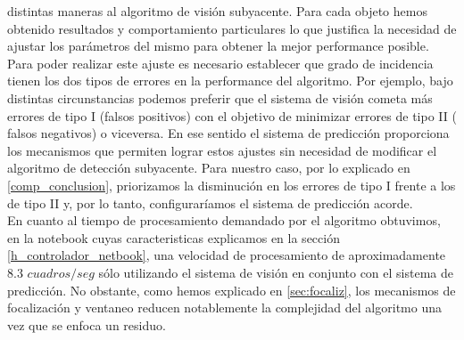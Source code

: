 distintas maneras al algoritmo de visi\'on subyacente. Para cada objeto 
hemos obtenido resultados y comportamiento particulares lo que 
justifica la necesidad de ajustar los par\'ametros del mismo para obtener la mejor 
performance posible. Para poder realizar este ajuste es necesario 
establecer que grado de incidencia tienen los dos tipos de errores en la performance del
algoritmo. Por ejemplo, bajo distintas circunstancias podemos preferir que el  
sistema de visi\'on cometa m\'as errores de tipo I (falsos positivos) con 
el objetivo de minimizar errores de tipo II ( falsos negativos) o 
viceversa. En ese sentido el sistema de predicci\'on proporciona los mecanismos que 
permiten lograr estos ajustes sin necesidad de modificar el algoritmo de detecci\'on 
subyacente. Para nuestro caso, por lo explicado en \ref{comp_conclusion}, priorizamos 
la disminuci\'on en los errores de tipo I frente a los de tipo II y, por lo tanto, configurar\'iamos
el sistema de predicci\'on acorde.\\
\indent En cuanto al tiempo de procesamiento demandado por el algoritmo obtuvimos, en la notebook
cuyas caracteristicas explicamos en la secci\'on \ref{h_controlador_netbook},
una velocidad de procesamiento de aproximadamente $8.3$ $cuadros/seg$ s\'olo utilizando
el sistema de visi\'on en conjunto con el sistema de predicci\'on. No obstante, como hemos explicado
en \ref{sec:focaliz}, los mecanismos de focalizaci\'on y ventaneo reducen notablemente la
complejidad del algoritmo una vez que se enfoca un residuo.
 

